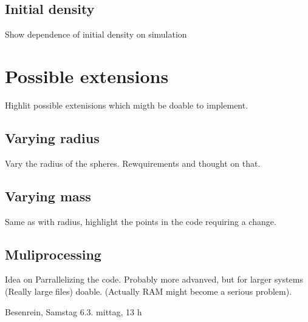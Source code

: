 \subsection{Initial density}
\label{sec:}
Show dependence of initial density on simulation

\section{Possible extensions}
\label{sec:simulation_ext}
Highlit possible extenisions which migth be doable to implement.

\subsection{Varying radius}
\label{sec:extension_radius}
Vary the radius of the spheres. Rewquirements and thought on that.

\subsection{Varying mass}
\label{sec:extension_mass}
Same as with radius, highlight the points in the code requiring a change.

\subsection{Muliprocessing}
\label{sec:extension_MP}
Idea on Parrallelizing the code. Probably more advanved, but for larger systems (Really large files) doable. (Actually RAM might become a serious problem).

Besenrein, Samstag 6.3.  mittag, 13 h 



